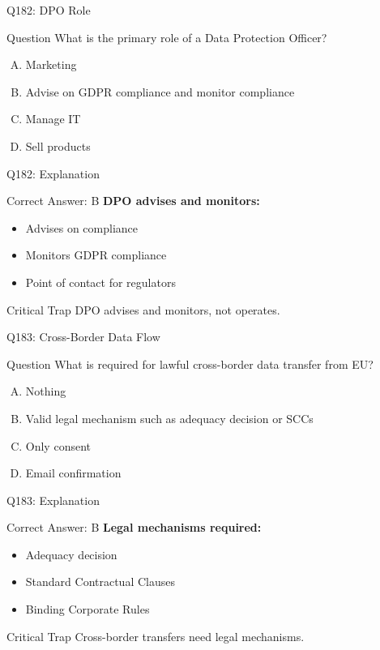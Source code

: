 \documentclass{beamer}
\begin{document}
	\begin{frame}{Q182: DPO Role}
		\begin{block}{Question}
			What is the primary role of a Data Protection Officer?
		\end{block}
		\begin{enumerate}[(A)]
			\item Marketing
			\item Advise on GDPR compliance and monitor compliance
			\item Manage IT
			\item Sell products
		\end{enumerate}
	\end{frame}
	
	\begin{frame}{Q182: Explanation}
		\begin{block}{Correct Answer: B}
			\textbf{DPO advises and monitors:}
			\begin{itemize}
				\item Advises on compliance
				\item Monitors GDPR compliance
				\item Point of contact for regulators
			\end{itemize}
		\end{block}
		\begin{alertblock}{Critical Trap}
			DPO advises and monitors, not operates.
		\end{alertblock}
	\end{frame}
	
	\begin{frame}{Q183: Cross-Border Data Flow}
		\begin{block}{Question}
			What is required for lawful cross-border data transfer from EU?
		\end{block}
		\begin{enumerate}[(A)]
			\item Nothing
			\item Valid legal mechanism such as adequacy decision or SCCs
			\item Only consent
			\item Email confirmation
		\end{enumerate}
	\end{frame}
	
	\begin{frame}{Q183: Explanation}
		\begin{block}{Correct Answer: B}
			\textbf{Legal mechanisms required:}
			\begin{itemize}
				\item Adequacy decision
				\item Standard Contractual Clauses
				\item Binding Corporate Rules
			\end{itemize}
		\end{block}
		\begin{alertblock}{Critical Trap}
			Cross-border transfers need legal mechanisms.
		\end{alertblock}
	\end{frame}
	
\end{document}
